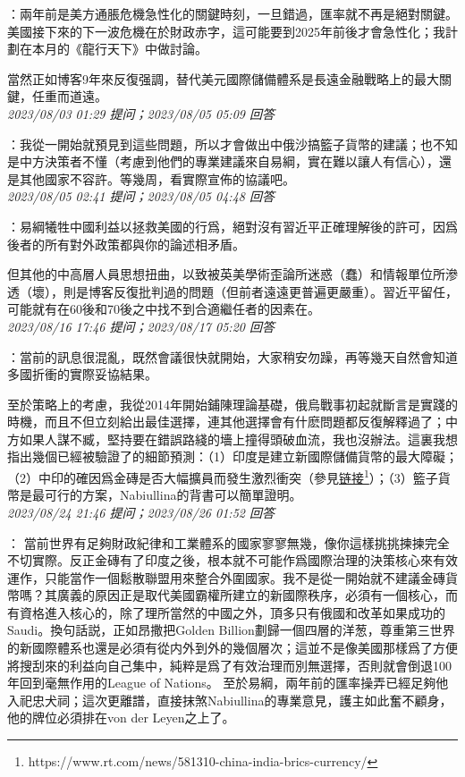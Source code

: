\documentclass[twocolumn]{ctexart}
\begin{document}
：兩年前是美方通脹危機急性化的關鍵時刻，一旦錯過，匯率就不再是絕對關鍵。美國接下來的下一波危機在於財政赤字，這可能要到2025年前後才會急性化；我計劃在本月的《龍行天下》中做討論。

當然正如博客9年來反復强調，替代美元國際儲備體系是長遠金融戰略上的最大關鍵，任重而道遠。
\\

\textit{\hfill\noindent\small 2023/08/03 01:29 提问；2023/08/05 05:09 回答}

：我從一開始就預見到這些問題，所以才會做出中俄沙搞籃子貨幣的建議；也不知是中方決策者不懂（考慮到他們的專業建議來自易綱，實在難以讓人有信心），還是其他國家不容許。等幾周，看實際宣佈的協議吧。
\\

\textit{\hfill\noindent\small 2023/08/05 02:41 提问；2023/08/05 04:48 回答}

：易綱犧牲中國利益以拯救美國的行爲，絕對沒有習近平正確理解後的許可，因爲後者的所有對外政策都與你的論述相矛盾。

但其他的中高層人員思想扭曲，以致被英美學術歪論所迷惑（蠢）和情報單位所滲透（壞），則是博客反復批判過的問題（但前者遠遠更普遍更嚴重）。習近平留任，可能就有在60後和70後之中找不到合適繼任者的因素在。
\\

\textit{\hfill\noindent\small 2023/08/16 17:46 提问；2023/08/17 05:20 回答}

：當前的訊息很混亂，既然會議很快就開始，大家稍安勿躁，再等幾天自然會知道多國折衝的實際妥協結果。

至於策略上的考慮，我從2014年開始鋪陳理論基礎，俄烏戰事初起就斷言是實踐的時機，而且不但立刻給出最佳選擇，連其他選擇會有什麽問題都反復解釋過了；中方如果人謀不臧，堅持要在錯誤路綫的墻上撞得頭破血流，我也沒辦法。這裏我想指出幾個已經被驗證了的細節預測：（1）印度是建立新國際儲備貨幣的最大障礙；（2）中印的確因爲金磚是否大幅擴員而發生激烈衝突（參見\href{https://www.rt.com/news/581310-china-india-brics-currency/}{链接\footnote{\url{https://www.rt.com/news/581310-china-india-brics-currency/}}}）；（3）籃子貨幣是最可行的方案，Nabiullina的背書可以簡單證明。
\\

\textit{\hfill\noindent\small 2023/08/24 21:46 提问；2023/08/26 01:52 回答}

：
當前世界有足夠財政紀律和工業體系的國家寥寥無幾，像你這樣挑挑揀揀完全不切實際。反正金磚有了印度之後，根本就不可能作爲國際治理的決策核心來有效運作，只能當作一個鬆散聯盟用來整合外圍國家。我不是從一開始就不建議金磚貨幣嗎？其廣義的原因正是取代美國霸權所建立的新國際秩序，必須有一個核心，而有資格進入核心的，除了理所當然的中國之外，頂多只有俄國和改革如果成功的Saudi。換句話説，正如昂撒把Golden Billion劃歸一個四層的洋葱，尊重第三世界的新國際體系也還是必須有從内外到外的幾個層次；這並不是像美國那樣爲了方便將搜刮來的利益向自己集中，純粹是爲了有效治理而別無選擇，否則就會倒退100年回到毫無作用的League of Nations。
至於易綱，兩年前的匯率操弄已經足夠他入祀忠犬祠；這次更離譜，直接抹煞Nabiullina的專業意見，護主如此奮不顧身，他的牌位必須排在von der Leyen之上了。
\\
\end{document}
